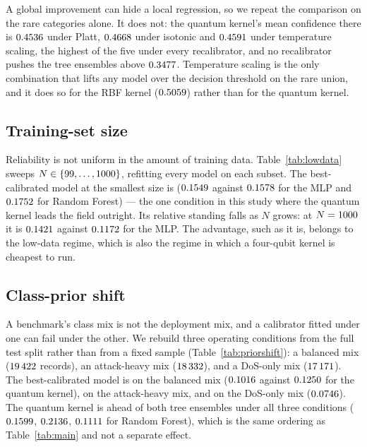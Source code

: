 \documentclass[journal]{IEEEtran}
\begin{document}
A global improvement can hide a local regression, so we repeat the
comparison on the rare categories alone. It does not: the quantum kernel's
mean confidence there is $0.4536$ under Platt,
$0.4668$ under isotonic and $0.4591$ under temperature
scaling, the highest of the five under every recalibrator, and no
recalibrator pushes the tree ensembles above $0.3477$. Temperature
scaling is the only combination that lifts any model over the decision
threshold on the rare union, and it does so for the RBF kernel
($0.5059$) rather than for the quantum kernel.



\subsection{Training-set size}
Reliability is not uniform in the amount of training data.
Table~\ref{tab:lowdata} sweeps $N\in\{99,\ldots,1000\}$, refitting
every model on each subset. The best-calibrated model at the smallest size
is \pldWinnerMin{} ($0.1549$ against $0.1578$ for the MLP and
$0.1752$ for Random Forest) --- the one condition in this study where the
quantum kernel leads the field outright. Its relative standing falls as $N$
grows: at $N=1000$ it is $0.1421$ against $0.1172$ for the MLP.
The advantage, such as it is, belongs to the low-data regime, which is also
the regime in which a four-qubit kernel is cheapest to run.

\subsection{Class-prior shift}
A benchmark's class mix is not the deployment mix, and a calibrator fitted
under one can fail under the other. We rebuild three operating conditions
from the full test split rather than from a fixed sample
(Table~\ref{tab:priorshift}): a balanced mix ($19\,422$ records), an
attack-heavy mix ($18\,332$), and a DoS-only mix ($17\,171$). The
best-calibrated model is \ppsBalWinner{} on the balanced mix ($0.1016$
against $0.1250$ for the quantum kernel), \ppsAttWinner{} on the
attack-heavy mix, and \ppsDosWinner{} on the DoS-only mix ($0.0746$).
The quantum kernel is ahead of both tree ensembles under all three
conditions ($0.1599$, $0.2136$, $0.1111$ for Random Forest), which
is the same ordering as Table~\ref{tab:main} and not a separate effect.
\end{document}
